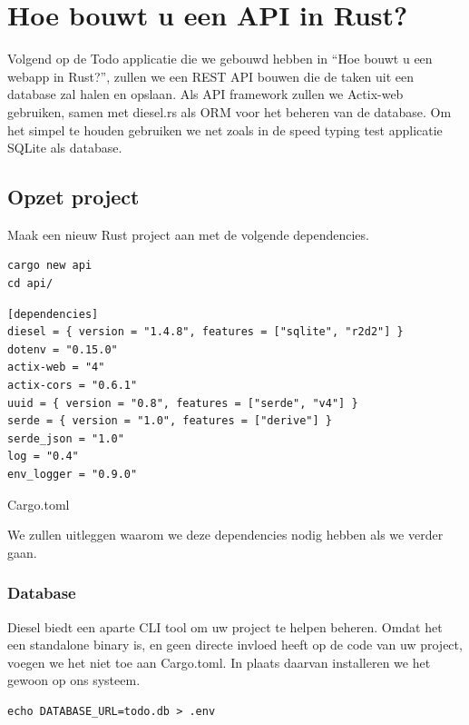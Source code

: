 \section{Hoe bouwt u een API in Rust?}

Volgend op de Todo applicatie die we gebouwd hebben in \enquote{Hoe bouwt u een webapp in Rust?},
zullen we een REST API bouwen die de taken uit een database zal halen en opslaan. Als API framework
zullen we Actix-web gebruiken, samen met diesel.rs als ORM voor het beheren van de database. Om het
simpel te houden gebruiken we net zoals in de speed typing test applicatie SQLite als database.
\cite{diesel} \cite{actix_docs}


\subsection{Opzet project}

Maak een nieuw Rust project aan met de volgende dependencies.

\begin{verbatim}
cargo new api
cd api/
\end{verbatim}

\begin{listing}[h]
\begin{verbatim}
[dependencies]
diesel = { version = "1.4.8", features = ["sqlite", "r2d2"] }
dotenv = "0.15.0"
actix-web = "4"
actix-cors = "0.6.1"
uuid = { version = "0.8", features = ["serde", "v4"] }
serde = { version = "1.0", features = ["derive"] }
serde_json = "1.0"
log = "0.4"
env_logger = "0.9.0"
\end{verbatim}
\caption{Cargo.toml}
\end{listing}

We zullen uitleggen waarom we deze dependencies nodig hebben als we verder gaan.

\subsubsection{Database}

Diesel biedt een aparte CLI tool om uw project te helpen beheren. Omdat het een standalone binary
is, en geen directe invloed heeft op de code van uw project, voegen we het niet toe aan Cargo.toml.
In plaats daarvan installeren we het gewoon op ons systeem.

\begin{verbatim}
echo DATABASE_URL=todo.db > .env
\end{verbatim}

